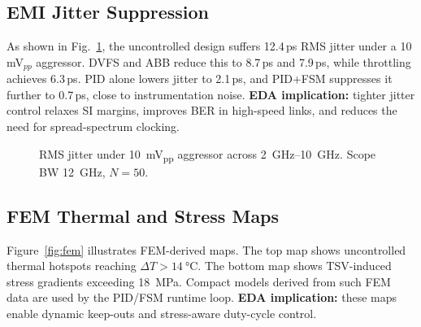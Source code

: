\documentclass[conference]{IEEEtran}
\begin{document}
\subsection{EMI Jitter Suppression}
As shown in Fig.~\ref{fig:emi}, the uncontrolled design suffers 12.4\,ps RMS jitter under a 10\,mV$_{pp}$ aggressor. DVFS and ABB reduce this to 8.7\,ps and 7.9\,ps, while throttling achieves 6.3\,ps. PID alone lowers jitter to 2.1\,ps, and PID+FSM suppresses it further to 0.7\,ps, close to instrumentation noise.  
\textbf{EDA implication:} tighter jitter control relaxes SI margins, improves BER in high-speed links, and reduces the need for spread-spectrum clocking.

\begin{figure}[t]
\centering
{}
\caption{RMS jitter under \SI{10}{mV_{pp}} aggressor across \SIrange{2}{10}{GHz}. Scope BW \SI{12}{GHz}, $N=50$.}
\label{fig:emi}
\end{figure}

\subsection{FEM Thermal and Stress Maps}
Figure~\ref{fig:fem} illustrates FEM-derived maps. The top map shows uncontrolled thermal hotspots reaching $\Delta T>\SI{14}{\celsius}$. The bottom map shows TSV-induced stress gradients exceeding \SI{18}{MPa}. Compact models derived from such FEM data are used by the PID/FSM runtime loop.%
\textbf{ EDA implication:} these maps enable dynamic keep-outs and stress-aware duty-cycle control.
\end{document}
